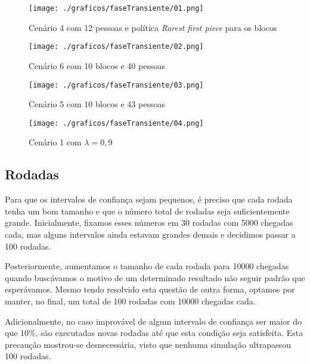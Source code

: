 \documentclass[a4paper,10pt]{article}
\begin{document}
\pagebreak

\begin{figure}
	\caption{Cenário 4 com 12 pessoas e política \textit{Rarest first piece} para os blocos}
	\label{grafTransienteCen4b02n12rf}
	\texttt{[image: ./graficos/faseTransiente/01.png]}
\end{figure}

\begin{figure}
	\caption{Cenário 6 com 10 blocos e 40 pessoas}
	\label{grafTransienteCen6b10n40rr}
	\texttt{[image: ./graficos/faseTransiente/02.png]}
\end{figure}

\clearpage

\begin{figure}
	\caption{Cenário 5 com 10 blocos e 43 pessoas}
	\label{grafTransienteCen5b10n43rr}
	\texttt{[image: ./graficos/faseTransiente/03.png]}
\end{figure}

\begin{figure}
	\caption{Cenário 1 com $\lambda = 0,9$}
	\label{grafTransienteCen1lamb0.9}
	\texttt{[image: ./graficos/faseTransiente/04.png]}
\end{figure}

\clearpage
\pagebreak

\subsection{Rodadas}

Para que os intervalos de confiança sejam pequenos, é preciso que cada rodada tenha um bom tamanho e que o número total de rodadas seja suficientemente grande. Inicialmente, fixamos esses números em 30 rodadas com 5000 chegadas cada, mas alguns intervalos ainda estavam grandes demais e decidimos passar a 100 rodadas.

Posteriormente, aumentamos o tamanho de cada rodada para 10000 chegadas quando buscávamos o motivo de um determinado resultado não seguir padrão que esperávamos. Mesmo tendo resolvido esta questão de outra forma, optamos por manter, no final, um total de 100 rodadas com 10000 chegadas cada.

Adicionalmente, no caso improvável de algum intervalo de confiança ser maior do que 10\%, são executadas novas rodadas até que esta condição seja satisfeita. Esta precaução mostrou-se desnecessária, visto que nenhuma simulação ultrapassou 100 rodadas.
\end{document}
